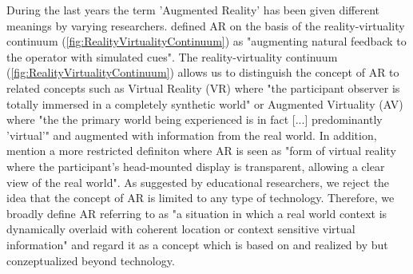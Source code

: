 During the last years the term 'Augmented Reality' has been given different meanings by varying researchers. \autocite [cf.][42]{Wu.2013} \cite{Milgram.1994b} defined AR on the basis of the reality-virtuality continuum (\ref{fig:RealityVirtualityContinuum}) as "augmenting natural feedback to the operator with simulated cues". \autocite[283]{Milgram.1994b} The reality-virtuality continuum (\ref{fig:RealityVirtualityContinuum}) allows us to distinguish the concept of AR to related concepts such as Virtual Reality (VR) where "the participant observer is totally immersed in a completely synthetic world" \autocite[283]{Milgram.1994b} or Augmented Virtuality (AV) where "the the primary world being experienced is in fact [...] predominantly 'virtual'"\autocite[4]{Milgram.1994} %
and augmented with information from the real world. In addition, \cite{Milgram.1994b} mention a more restricted definiton where AR is seen as "form of virtual reality where the participant's head-mounted display is transparent, allowing a clear view of the real world". \autocite[283]{Milgram.1994b} As suggested by educational researchers,\autocite[cf.][42]{Wu.2013} we reject the idea that the concept of AR is limited to any type of technology. Therefore, we broadly define AR referring to \cite{Klopfer.2008} as "a situation in which a real world context is dynamically overlaid with coherent location or context sensitive virtual information"\autocite[205]{Klopfer.2008} and regard it as a concept which is based on and realized by but conzeptualized beyond technology.


